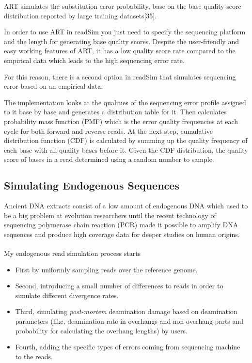 \documentclass[11pt,a4paper]{report}
\begin{document}
ART simulates the substitution error probability, base on the base
quality score distribution reported by large training datasets[35].

In order to use ART in readSim you just need to specify the sequencing platform 
and the length for generating base quality scores. Despite the user-friendly 
and easy working features of ART, it has a low quality score rate compared
to the empirical data\cite{bwa} which leads to the high sequencing error rate.

For this reason, there is a second option in readSim that simulates
sequencing error based on an empirical data.

The implementation looks at the qualities of the sequencing error profile assigned to it base by base and generates a 
distribution table for it. Then calculates probability mass function (PMF) 
which is the error quality frequencies at each cycle for both forward and 
reverse reads. At the next step, cumulative distribution function (CDF) is calculated 
by summing up the quality frequency of each base with all quality bases before it. 
Given the CDF distribution, the quality score of bases in a read determined using a 
random number to sample.




\subsection{Simulating Endogenous Sequences}

Ancient DNA extracts consist of a low amount of endogenous DNA which used to be a big problem at evolution researchers until the recent technology of sequencing polymerase chain reaction (PCR) \cite{PCR} made it possible to amplify DNA sequences and produce high coverage data for deeper studies on human origins.
\\\\
My endogenous read simulation process starts
\begin{itemize}
 \item First by uniformly sampling reads over the reference genome.

 \item Second, introducing a small number of differences to 
 reads in order to simulate different divergence rates.

 \item Third, simulating \emph{post-mortem} deamination damage based on deamination parameters (like, deamination rate in overhangs and non-overhang parts and probability for calculating the overhang lengths) by users. 

 \item Fourth,  adding the specific types of errors coming from sequencing machine to the reads.
\end{itemize}
\end{document}
